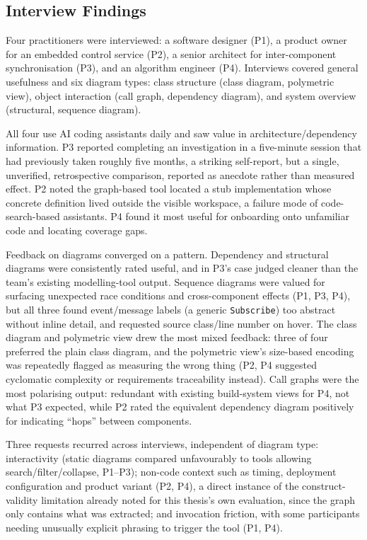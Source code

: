 \subsection{Interview Findings}\label{sec:interview-findings}

Four practitioners were interviewed: a software designer (P1), a product
owner for an embedded control service (P2), a senior architect for
inter-component synchronisation (P3), and an algorithm engineer (P4).
Interviews covered general usefulness and six diagram types: class
structure (class diagram, polymetric view), object interaction (call
graph, dependency diagram), and system overview (structural, sequence
diagram).

All four use AI coding assistants daily and saw value in
architecture/dependency information. P3 reported completing an
investigation in a five-minute session that had previously taken roughly
five months, a striking self-report, but a single, unverified,
retrospective comparison, reported as anecdote rather than measured
effect. P2 noted the graph-based tool located a stub implementation
whose concrete definition lived outside the visible workspace, a failure
mode of code-search-based assistants. P4 found it most useful for
onboarding onto unfamiliar code and locating coverage gaps.

Feedback on diagrams converged on a pattern. Dependency and structural
diagrams were consistently rated useful, and in P3's case judged cleaner
than the team's existing modelling-tool output. Sequence diagrams were
valued for surfacing unexpected race conditions and cross-component
effects (P1, P3, P4), but all three found event/message labels (\eg a
generic \texttt{Subscribe}) too abstract without inline detail, and
requested source class/line number on hover. The class diagram and
polymetric view drew the most mixed feedback: three of four preferred
the plain class diagram, and the polymetric view's size-based encoding
was repeatedly flagged as measuring the wrong thing (P2, P4 suggested
cyclomatic complexity or requirements traceability instead). Call graphs
were the most polarising output: redundant with existing build-system
views for P4, not what P3 expected, while P2 rated the equivalent
dependency diagram positively for indicating ``hops'' between
components.

Three requests recurred across interviews, independent of diagram type:
interactivity (static diagrams compared unfavourably to tools allowing
search/filter/collapse, P1--P3); non-code context such as timing,
deployment configuration and product variant (P2, P4), a direct
instance of the construct-validity limitation already noted for this
thesis's own evaluation, since the graph
only contains what was extracted; and invocation friction, with some
participants needing unusually explicit phrasing to trigger the tool
(P1, P4).

